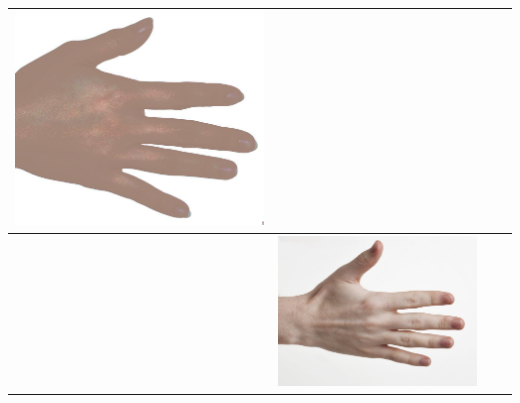 \begin{longtable}{|N||c|c|c|}
\begin{minipage}{.29\textwidth}
    \includegraphics[width=\textwidth,height=\textheight,keepaspectratio]{../rc_test/outputs/20170517_proportional_corrected_test_alpha10/hand_light_to_hand_pale.jpg}
  \end{minipage} \\
\hline  \label{row:prop_correct_test_a10_hand_pale_to_hand_dark} &
  \begin{minipage}{.29\textwidth}
    \includegraphics[width=\textwidth,height=\textheight,keepaspectratio]{../inputs/hand_pale.jpg}
  \end{minipage} & 
  \begin{minipage}{.29\textwidth}

\end{minipage}
\end{longtable}
